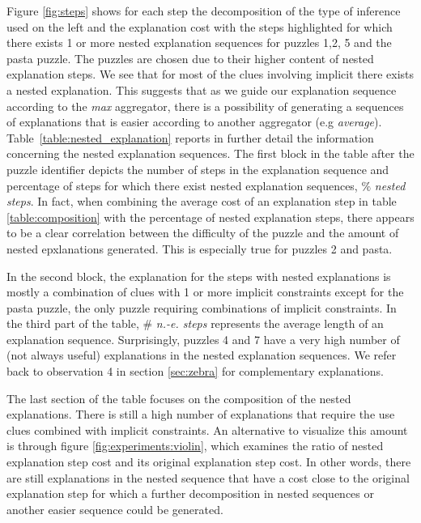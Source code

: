 Figure \ref{fig:steps} shows for each step the decomposition of the type of inference used on the left and the explanation cost with the steps highlighted for which there exists 1 or more nested explanation sequences for puzzles 1,2, 5 and the pasta puzzle.
The puzzles are chosen due to their higher content of nested explanation steps. 
We see that for most of the clues involving implicit there exists a nested explanation. 
This suggests that as we guide our explanation sequence according to the \textit{max} aggregator, there is a possibility of generating a sequences of explanations that is easier according to another aggregator (e.g \textit{average}). 
Table~\ref{table:nested_explanation} reports in further detail the information concerning the nested explanation sequences. The first block in the table after the puzzle identifier depicts the number of steps in the explanation sequence and percentage of steps for which there exist nested explanation sequences, $\%$ \textit{nested steps}. 
In fact, when combining the average cost of an explanation step in table \ref{table:composition} with the percentage of nested explanation steps, there appears to be a clear correlation between the difficulty of the puzzle and the amount of nested epxlanations generated. This is especially true for puzzles 2 and pasta.

In the second block, the explanation for the steps with nested explanations is mostly a combination of clues with 1 or more implicit constraints except for the pasta puzzle, the only puzzle requiring combinations of implicit constraints.
In the third part of the table, $\#$ \textit{n.-e. steps} represents the average length of an explanation sequence. Surprisingly, puzzles 4 and 7 have a very high number of (not always useful) explanations in the nested explanation sequences. We refer back to observation 4 in section \ref{sec:zebra} for complementary explanations. 

The last section of the table focuses on the composition of the nested explanations. 
There is still a high number of explanations that require the use clues combined with implicit constraints. 
An alternative to visualize this amount is through figure \ref{fig:experiments:violin}, which examines the ratio of nested explanation step cost and its original explanation step cost. 
In other words, there are still explanations in the nested sequence that have a cost close to the original explanation step for which a further decomposition in nested sequences or another easier sequence could be generated. 



